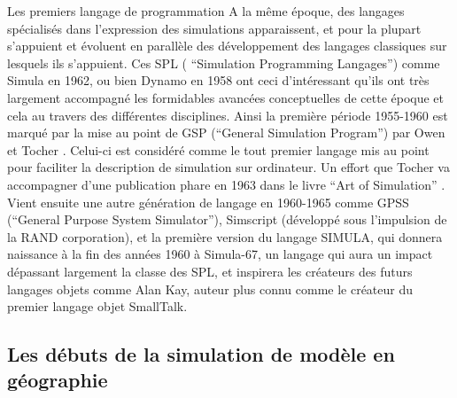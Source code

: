 \begin{framewithtitle}{ Les premiers langage de programmation }
A la même époque, des langages spécialisés dans l'expression des simulations apparaissent, et pour la plupart s'appuient et évoluent en parallèle des développement des langages classiques sur lesquels ils s'appuient. Ces SPL ( \foreignquote{english}{Simulation Programming Langages}) comme Simula en 1962, ou bien Dynamo en 1958 ont ceci d'intéressant qu'ils ont très largement accompagné les formidables avancées conceptuelles de cette époque et cela au travers des différentes disciplines. Ainsi la première période 1955-1960 est marqué par la mise au point de GSP (\foreignquote{english}{General Simulation Program}) par Owen et Tocher \autocite{Tocher1960}. Celui-ci est considéré comme le tout premier langage mis au point pour faciliter la description de simulation sur ordinateur. Un effort que Tocher va accompagner d'une publication phare en 1963 dans le livre \foreignquote{english}{Art of Simulation} \autocite{Tocher1963} . Vient ensuite une autre génération de langage en 1960-1965 comme GPSS (\foreignquote{english}{General Purpose System Simulator}), Simscript (développé sous l'impulsion de la RAND corporation), et la première version du langage SIMULA, qui donnera naissance à la fin des années 1960 à Simula-67, un langage qui aura un impact dépassant largement la classe des SPL, et inspirera les créateurs des futurs langages objets comme Alan Kay, auteur plus connu comme le créateur du premier langage objet SmallTalk. 

\end{framewithtitle}


\subsection{Les débuts de la simulation de modèle en géographie}

